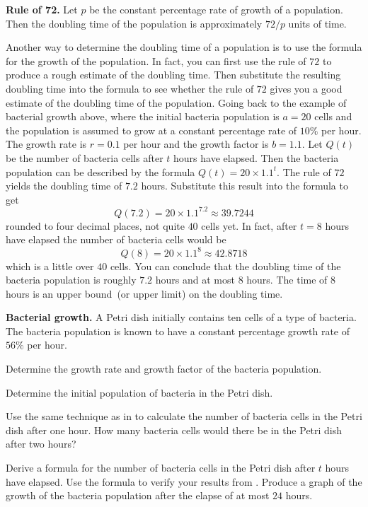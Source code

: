 \documentclass[a4paper,oneside,12pt]{article}
\begin{document}
\begin{theorem}
\textbf{Rule of 72.}
Let $p$ be the constant percentage rate of growth of a population.
Then the doubling time of the population is approximately $72 / p$
units of time.
\end{theorem}

Another way to determine the doubling time of a population is to use
the formula for the growth of the population.  In fact, you can first
use the rule of $72$ to produce a rough estimate of the doubling
time.  Then substitute the resulting doubling time into the formula to
see whether the rule of $72$ gives you a good estimate of the doubling
time of the population.  Going back to the example of bacterial growth
above, where the initial bacteria population is $a = 20$ cells and the
population is assumed to grow at a constant percentage rate of $10\%$
per hour.  The growth rate is $r = 0.1$ per hour and the growth factor
is $b = 1.1$.  Let $Q(t)$ be the number of bacteria cells after $t$
hours have elapsed.  Then the bacteria population can be described by
the formula $Q(t) = 20 \times 1.1^t$.  The rule of $72$ yields the
doubling time of $7.2$ hours.  Substitute this result into the formula
to get
\[
Q(7.2)
=
20 \times 1.1^{7.2}
\approx
39.7244
\]
rounded to four decimal places, not quite $40$ cells yet.  In fact,
after $t = 8$ hours have elapsed the number of bacteria cells would be
\[
Q(8)
=
20 \times 1.1^8
\approx
42.8718
\]
which is a little over $40$ cells.  You can conclude that the doubling
time of the bacteria population is roughly $7.2$ hours and at most $8$
hours.  The time of $8$ hours is an upper bound~(or upper limit) on
the doubling time.

\begin{example}
\label{eg:bacterial_growth}
\textbf{Bacterial growth.}
A Petri dish initially contains ten cells of a type of bacteria.  The
bacteria population is known to have a constant percentage growth rate
of $56\%$ per hour.
\begin{packedenum}
\item\label{subeg:bacteria_growth_rate}
  Determine the growth rate and growth factor of the bacteria
  population.

\item\label{subeg:bacteria_initial_population}
  Determine the initial population of bacteria in the Petri dish.

\item\label{subeg:bacteria_growth_1_2_hours}
  Use the same technique as in
   to calculate
  the number of bacteria cells in the Petri dish after one hour.  How
  many bacteria cells would there be in the Petri dish after two
  hours?

\item\label{subeg:bacteria_growth_formula}
  Derive a formula for the number of bacteria cells in the Petri dish
  after $t$ hours have elapsed.  Use the formula to verify your
  results from .  Produce a
  graph of the growth of the bacteria population after the elapse of
  at most $24$ hours.
\end{packedenum}
\end{example}
\end{document}
